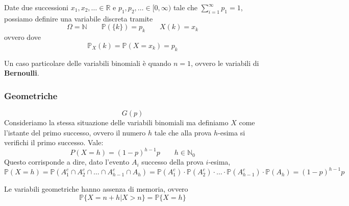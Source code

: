 \begin{observation}
	Date due successioni $x_1,x_2, \ldots \in \mathbb{R}$ e $p_1, p_2, \ldots \in [0, \infty)$ tale che $\sum_{i=1}^{\infty}p_1 = 1$, possiamo definire una variabile discreta tramite
	\begin{equation}
		\Omega = \mathbb{N} \quad\quad \mathbb{P}(\{k\})=p_k \quad\quad X(k) = x_k
	\end{equation}
	ovvero dove
	\begin{equation*}
		\mathbb{P}_X(k) = \mathbb{P}(X = x_k) = p_k
	\end{equation*}
\end{observation}
Un caso particolare delle variabili binomiali è quando $n=1$, ovvero le variabili di \textbf{Bernoulli}.

\subsubsection{Geometriche}
\begin{equation}
	G(p)
\end{equation}
Consideriamo la stessa situazione delle variabili binomiali ma definiamo $X$ come l'istante del primo successo, ovvero il numero $h$ tale che alla prova $h$-esima si verifichi il primo successo. Vale:
\begin{equation}
	P(X=h)=(1-p)^{h-1}p \quad\quad h \in \mathbb{N}_0
\end{equation}
Questo corrisponde a dire, dato l'evento $A_i$ successo della prova $i$-esima,
\begin{equation*}
	\mathbb{P}(X=h) = \mathbb{P}(A^c_1 \cap A^c_2 \cap \ldots \cap A^c_{h-1} \cap A_h) = \mathbb{P}(A^c_1) \cdot \mathbb{P}(A^c_2) \cdot \ldots \cdot \mathbb{P}(A^c_{h-1}) \cdot \mathbb{P}(A_h) = (1-p)^{h-1}p
\end{equation*} 

\begin{observation}
	Le variabili geometriche hanno assenza di memoria, ovvero
	\begin{equation}
		\mathbb{P}\{X=n+h \vert X >n \} = \mathbb{P}\{X=h\}
	\end{equation}
\end{observation}


